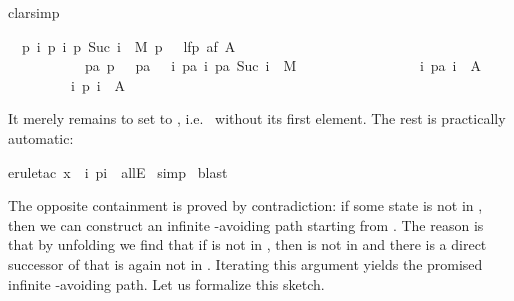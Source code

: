 \begin{isabellebody}
clarsimp{\isacharparenright}%
\begin{isamarkuptxt}%
\begin{isabelle}
\ \ {\isasymAnd}p{\isachardot}\ {\isasymlbrakk}{\isasymforall}i{\isachardot}\ {\isacharparenleft}p\ i{\isacharcomma}\ p\ {\isacharparenleft}Suc\ i{\isacharparenright}{\isacharparenright}\ {\isasymin}\ M{\isacharsemicolon}\ p\ \ {\isasymin}\ lfp\ {\isacharparenleft}af\ A{\isacharparenright}{\isacharsemicolon}\isanewline
\ \ \ \ \ \ \ \ \ \ \ {\isasymforall}pa{\isachardot}\ p\ \ {\isacharequal}\ pa\ \ {\isasymand}\ {\isacharparenleft}{\isasymforall}i{\isachardot}\ {\isacharparenleft}pa\ i{\isacharcomma}\ pa\ {\isacharparenleft}Suc\ i{\isacharparenright}{\isacharparenright}\ {\isasymin}\ M{\isacharparenright}\ {\isasymlongrightarrow}\isanewline
\ \ \ \ \ \ \ \ \ \ \ \ \ \ \ \ {\isacharparenleft}{\isasymexists}i{\isachardot}\ pa\ i\ {\isasymin}\ A{\isacharparenright}{\isasymrbrakk}\isanewline
\ \ \ \ \ \ \ \ {\isasymLongrightarrow}\ {\isasymexists}i{\isachardot}\ p\ i\ {\isasymin}\ A
\end{isabelle}
It merely remains to set  to , i.e.\  without its
first element. The rest is practically automatic:%
\end{isamarkuptxt}%
erule{\isacharunderscore}tac\ x\ {\isacharequal}\ {\isachardoublequote}{\isasymlambda}i{\isachardot}\ p{\isacharparenleft}i{\isacharplus}\ \ allE{\isacharparenright}\isanewline
{}\ simp\isanewline
{}\ blast\isanewline
{}%
\begin{isamarkuptext}%
The opposite containment is proved by contradiction: if some state
 is not in , then we can construct an
infinite -avoiding path starting from . The reason is
that by unfolding  we find that if  is not in
, then  is not in  and there is a
direct successor of  that is again not in . Iterating this argument yields the promised infinite
-avoiding path. Let us formalize this sketch.


\end{isamarkuptext}
\end{isabellebody}
